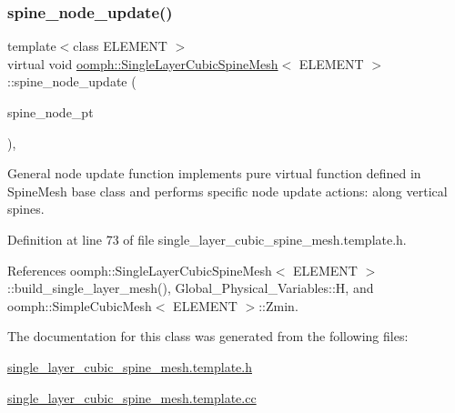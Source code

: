 \subsubsection{\texorpdfstring{spine\+\_\+node\+\_\+update()}{spine\_node\_update()}}
{\footnotesize\ttfamily template$<$class E\+L\+E\+M\+E\+NT $>$ \\
virtual void \hyperlink{classoomph_1_1SingleLayerCubicSpineMesh}{oomph\+::\+Single\+Layer\+Cubic\+Spine\+Mesh}$<$ E\+L\+E\+M\+E\+NT $>$\+::spine\+\_\+node\+\_\+update (\begin{DoxyParamCaption}\item[{Spine\+Node $\ast$}]{spine\+\_\+node\+\_\+pt }\end{DoxyParamCaption})\hspace{0.3cm}{\ttfamily [inline]}, {\ttfamily [virtual]}}



General node update function implements pure virtual function defined in Spine\+Mesh base class and performs specific node update actions\+: along vertical spines. 



Definition at line 73 of file single\+\_\+layer\+\_\+cubic\+\_\+spine\+\_\+mesh.\+template.\+h.



References oomph\+::\+Single\+Layer\+Cubic\+Spine\+Mesh$<$ E\+L\+E\+M\+E\+N\+T $>$\+::build\+\_\+single\+\_\+layer\+\_\+mesh(), Global\+\_\+\+Physical\+\_\+\+Variables\+::H, and oomph\+::\+Simple\+Cubic\+Mesh$<$ E\+L\+E\+M\+E\+N\+T $>$\+::\+Zmin.



The documentation for this class was generated from the following files\+:\begin{DoxyCompactItemize}
\item 
\hyperlink{single__layer__cubic__spine__mesh_8template_8h}{single\+\_\+layer\+\_\+cubic\+\_\+spine\+\_\+mesh.\+template.\+h}\item 
\hyperlink{single__layer__cubic__spine__mesh_8template_8cc}{single\+\_\+layer\+\_\+cubic\+\_\+spine\+\_\+mesh.\+template.\+cc}\end{DoxyCompactItemize}
